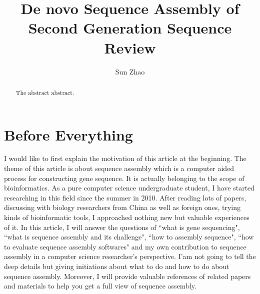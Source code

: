 \documentclass{article}
\title{De novo Sequence Assembly of Second Generation Sequence Review}
\author{Sun Zhao}
\begin{document}
\maketitle
\newpage

\begin{abstract}
The abstract abstract.
\end{abstract}

\section{Before Everything}
I would like to first explain the motivation of this article at the beginning. The theme of this article is about sequence assembly which is a computer aided process for constructing gene sequence. It is actually belonging to the scope of bioinformatics. As a pure computer science undergraduate student, I have started researching in this field since the summer in 2010. After reading lots of papers, discussing with biology researchers from China as well as foreign ones, trying kinds of bioinformatic tools, I approached nothing new but valuable experiences of it. In this article, I will answer the questions of ``what is gene sequencing", ``what is sequence assembly and its challenge", ``how to assembly sequence", ``how to evaluate sequence assembly softwares" and my own contribution to sequence assembly in a computer science researcher's perspective. I'am not going to tell the deep details but giving initiations about what to do and how to do about sequence assembly. Moreover, I will provide valuable references of related papers and materials to help you get a full view of sequence assembly.
\end{document}
